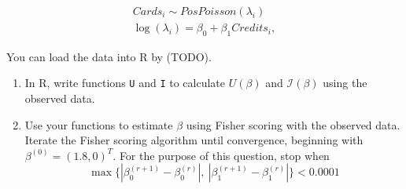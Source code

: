 \documentclass[11pt]{article}
\begin{document}
\begin{enumerate}
\begin{align*}
Cards_i \sim PosPoisson(\lambda_i) \\
\log(\lambda_i) = \beta_0 + \beta_1 Credits_i,
\end{align*}

You can load the data into R by (TODO). 

\begin{enumerate}
\item In R, write functions \verb;U; and \verb;I; to calculate $U(\beta)$ and $\mathcal{I}(\beta)$ using the observed data.

\item Use your functions to estimate $\beta$ using Fisher scoring with the observed data. Iterate the Fisher scoring algorithm until convergence, beginning with $\beta^{(0)} = (1.8, 0)^T$. For the purpose of this question, stop when 
$$\max \{ |\beta_0^{(r+1)} - \beta_0^{(r)}|, \ |\beta_1^{(r+1)} - \beta_1^{(r)}| \} < 0.0001$$
\end{enumerate}
\end{enumerate}
\end{document}
